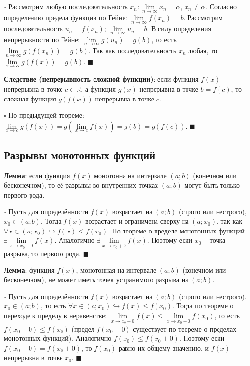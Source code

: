 \documentclass[12pt, a4paper, reqno]{article}
\begin{document}
    $\square$ Рассмотрим любую последовательность $x_n: \lim\limits_{n\to\infty} x_n = \alpha$,
    $x_n \neq \alpha$. Согласно определению предела функции по Гейне: $\lim\limits_{n\to\infty}
    f(x_n) = b$. Рассмотрим последовательность $u_n = f(x_n)$; $\lim\limits_{n\to\infty} u_n = b$.
    В силу определения непрерывности по Гейне: $\lim\limits_{n\to\infty} g(u_n) = g(b)$, то есть
    $\lim\limits_{n\to\infty} g(f(x_n)) = g(b)$. Так как последовательность $x_n$ любая, то
    $\lim\limits_{x\to\alpha} g(f(x)) = g(b)$. $\blacksquare$

    \textbf{Следствие (непрерывность сложной функции)}: если функция $f(x)$ непрерывна в точке
    $c\in\mathbb{R}$, а функция $g(x)$ непрерывна в точке $b = f(c)$, то сложная функция $g(f(x))$
    непрерывна в точке $c$.

    $\square$ По предыдущей теореме: $\lim\limits_{x\to c} g(f(x)) = g(\lim\limits_{x\to c} f(x))
    = g(b) = g(f(c))$. $\blacksquare$

\subsection{Разрывы монотонных функций}

    \textbf{Лемма}: если функция $f(x)$ монотонна на интервале $(a; b)$ (конечном или бесконечном),
    то её разрывы во внутренних точках $(a; b)$ могут быть только первого рода.

    $\square$ Пусть для определённости $f(x)$ возрастает на $(a; b)$ (строго или нестрого),
    $x_0\in(a; b)$. Тогда $f(x)$ возрастает и ограничена сверху на $(a; x_0)$, так как $\forall
    x\in(a; x_0)\hookrightarrow f(x) \leq f(x_0)$. По теореме о пределе монотонных функций
    $\exists \lim\limits_{x\to x_0 - 0} f(x)$. Аналогично $\exists\lim\limits_{x\to x_0 + 0} f(x)$.
    Поэтому если $x_0$ -- точка разрыва, то первого рода. $\blacksquare$

    \textbf{Лемма}: функция $f(x)$, монотонная на интервале $(a; b)$ (конечном или бесконечном), не
    может иметь точек устранимого разрыва на $(a; b)$.

    $\square$ Пусть для определённости $f(x)$ возрастает на $(a; b)$ (строго или нестрого),
    $x_0\in(a; b)$, то есть $\forall x\in(a; x_0)\hookrightarrow f(x) \leq f(x_0)$. Тогда по теореме о
    переходе к пределу в неравенстве: $\lim\limits_{x\to x_0 - 0} f(x) \leq
    \lim\limits_{x\to x_0 - 0} f(x_0)$, то есть $f(x_0 - 0) \leq f(x_0)$ (предел $f(x_0 - 0)$
    существует по теореме о пределах монотонных функций). Аналогично $f(x_0) \leq f(x_0 + 0)$.
    Поэтому если $f(x_0 - 0) = f(x_0 + 0)$, то $f(x_0)$ равно их общему значению, и $f(x)$
    непрерывна в точке $x_0$. $\blacksquare$
\end{document}
